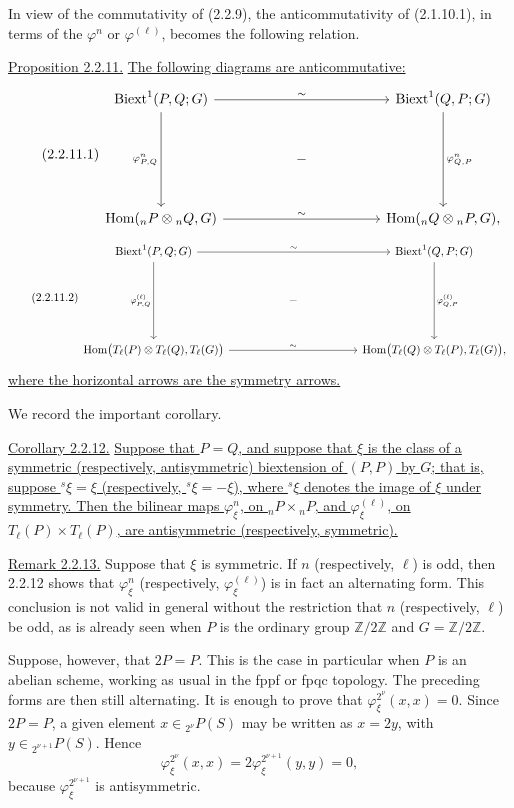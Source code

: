 In view of the commutativity of (2.2.9), the anticommutativity of
(2.1.10.1), in terms of the $\varphi^n$ or
$\varphi^{(\ell)}$, becomes the following relation.

\medskip
\noindent\underline{Proposition 2.2.11.}
\underline{The following diagrams are anticommutative:}
\begin{equation}\tag{2.2.11.1}
\begin{tikzcd}[row sep=large,column sep=huge]
 \mathrm{Biext}^1(P,Q;G)
   \arrow[rr,"\sim"]
   \arrow[dd,"{\varphi^n_{P,Q}}"']&&
 \mathrm{Biext}^1(Q,P;G)
   \arrow[dd,"{\varphi^n_{Q,P}}"]\\
 &- &\\
 \operatorname{Hom}({}_nP\otimes{}_nQ,G)
   \arrow[rr,"\sim"]&&
 \operatorname{Hom}({}_nQ\otimes{}_nP,G),
\end{tikzcd}
\end{equation}
\begin{equation}\tag{2.2.11.2}
\begin{tikzcd}[row sep=large,column sep=huge]
 \mathrm{Biext}^1(P,Q;G)
   \arrow[rr,"\sim"]
   \arrow[dd,"{\varphi^{(\ell)}_{P,Q}}"']&&
 \mathrm{Biext}^1(Q,P;G)
   \arrow[dd,"{\varphi^{(\ell)}_{Q,P}}"]\\
 &- &\\
 \operatorname{Hom}\bigl(
   T_\ell(P)\otimes T_\ell(Q),T_\ell(G)
 \bigr)
   \arrow[rr,"\sim"]&&
 \operatorname{Hom}\bigl(
   T_\ell(Q)\otimes T_\ell(P),T_\ell(G)
 \bigr),
\end{tikzcd}
\end{equation}
\underline{where the horizontal arrows are the symmetry arrows.}

We record the important corollary.

\medskip
\noindent\underline{Corollary 2.2.12.}
\underline{Suppose that $P=Q$, and suppose that $\xi$ is the class of
a symmetric (respectively, antisymmetric) biextension of $(P,P)$ by
$G$; that is, suppose ${}^s\xi=\xi$ (respectively,
${}^s\xi=-\xi$), where ${}^s\xi$ denotes the image of $\xi$ under
symmetry.  Then the bilinear maps $\varphi^n_\xi$, on
${}_nP\times{}_nP$, and $\varphi^{(\ell)}_\xi$, on
$T_\ell(P)\times T_\ell(P)$, are antisymmetric (respectively,
symmetric).}

\medskip
\noindent\underline{Remark 2.2.13.}
Suppose that $\xi$ is symmetric.  If $n$ (respectively, $\ell$) is
odd, then 2.2.12 shows that $\varphi^n_\xi$ (respectively,
$\varphi^{(\ell)}_\xi$) is in fact an alternating form.  This
conclusion is not valid in general without the restriction that $n$
(respectively, $\ell$) be odd, as is already seen when $P$ is the
ordinary group $\mathbb Z/2\mathbb Z$ and
$G=\mathbb Z/2\mathbb Z$.

Suppose, however, that $2P=P$.  This is the case in particular when
$P$ is an abelian scheme, working as usual in the fppf or fpqc
topology.  The preceding forms are then still alternating.  It is
enough to prove that $\varphi^{2^\nu}_\xi(x,x)=0$.  Since $2P=P$, a
given element $x\in{}_{2^\nu}P(S)$ may be written as $x=2y$, with
$y\in{}_{2^{\nu+1}}P(S)$.  Hence
\[
 \varphi^{2^\nu}_\xi(x,x)
 =2\varphi^{2^{\nu+1}}_\xi(y,y)=0,
\]
because $\varphi^{2^{\nu+1}}_\xi$ is antisymmetric.
